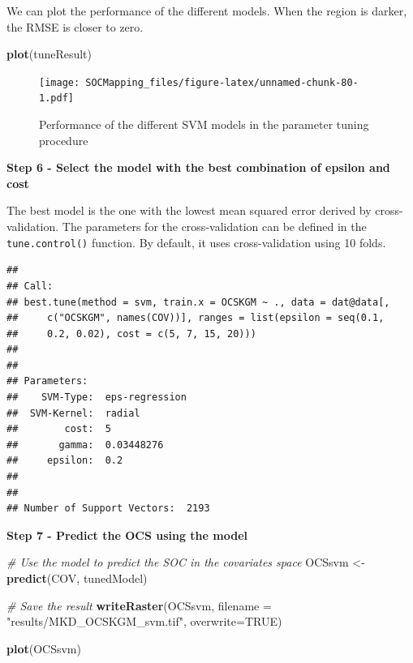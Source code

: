 \documentclass[10pt,b5paper,]{book}
\newenvironment{Shaded}{\begin{snugshade}}{\end{snugshade}}
\newcommand{\CommentTok}[1]{\textcolor[rgb]{0.56,0.35,0.01}{\textit{#1}}}
\newcommand{\DataTypeTok}[1]{\textcolor[rgb]{0.13,0.29,0.53}{#1}}
\newcommand{\KeywordTok}[1]{\textcolor[rgb]{0.13,0.29,0.53}{\textbf{#1}}}
\newcommand{\NormalTok}[1]{#1}
\newcommand{\OperatorTok}[1]{\textcolor[rgb]{0.81,0.36,0.00}{\textbf{#1}}}
\newcommand{\OtherTok}[1]{\textcolor[rgb]{0.56,0.35,0.01}{#1}}
\newcommand{\StringTok}[1]{\textcolor[rgb]{0.31,0.60,0.02}{#1}}
\theoremstyle{definition}
\theoremstyle{definition}
\theoremstyle{definition}
\theoremstyle{remark}
\begin{document}
We can plot the performance of the different models. When the region is
darker, the RMSE is closer to zero.

\begin{Shaded}
\begin{Highlighting}[]
\KeywordTok{plot}\NormalTok{(tuneResult)}
\end{Highlighting}
\end{Shaded}

\begin{figure}
\centering
\texttt{[image: SOCMapping\_files/figure-latex/unnamed-chunk-80-1.pdf]}
\caption{\label{fig:unnamed-chunk-80}Performance of the different SVM models
in the parameter tuning procedure}
\end{figure}

\textbf{Step 6 - Select the model with the best combination of epsilon
and cost}

The best model is the one with the lowest mean squared error derived by
cross-validation. The parameters for the cross-validation can be defined
in the \texttt{tune.control()} function. By default, it uses
cross-validation using 10 folds.

\begin{Shaded}
\end{Shaded}

\begin{verbatim}
## 
## Call:
## best.tune(method = svm, train.x = OCSKGM ~ ., data = dat@data[, 
##     c("OCSKGM", names(COV))], ranges = list(epsilon = seq(0.1, 
##     0.2, 0.02), cost = c(5, 7, 15, 20)))
## 
## 
## Parameters:
##    SVM-Type:  eps-regression 
##  SVM-Kernel:  radial 
##        cost:  5 
##       gamma:  0.03448276 
##     epsilon:  0.2 
## 
## 
## Number of Support Vectors:  2193
\end{verbatim}

\textbf{Step 7 - Predict the OCS using the model}

\begin{Shaded}
\begin{Highlighting}[]
\CommentTok{# Use the model to predict the SOC in the covariates space}
\NormalTok{OCSsvm <-}\StringTok{ }\KeywordTok{predict}\NormalTok{(COV, tunedModel)}

\CommentTok{# Save the result}
\KeywordTok{writeRaster}\NormalTok{(OCSsvm, }\DataTypeTok{filename =} \StringTok{"results/MKD_OCSKGM_svm.tif"}\NormalTok{,}
            \DataTypeTok{overwrite=}\OtherTok{TRUE}\NormalTok{)}

\KeywordTok{plot}\NormalTok{(OCSsvm)}
\end{Highlighting}
\end{Shaded}
\end{document}

